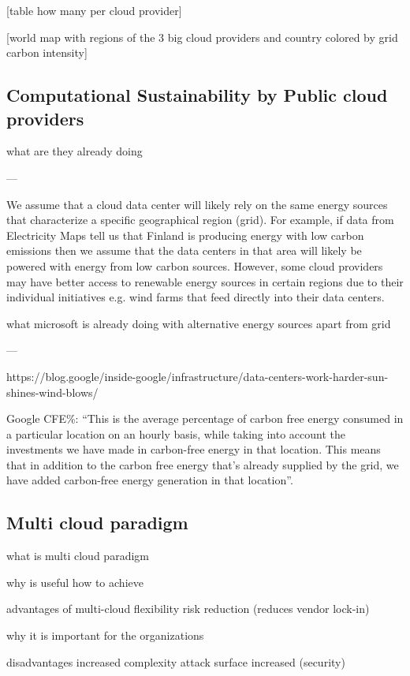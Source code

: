 [table how many per cloud provider]

[world map with regions of the 3 big cloud providers and country colored by grid carbon intensity]

\subsection{Computational Sustainability by Public cloud providers}

what are they already doing

---

We assume that a cloud data center will likely rely on the same energy sources that characterize a specific geographical region (grid).
For example, if data from Electricity Maps tell us that Finland is producing energy with low carbon emissions then we assume that the data centers in that area will likely be powered with energy from low carbon sources.
However, some cloud providers may have better access to renewable energy sources in certain regions due to their individual initiatives e.g. wind farms that feed directly into their data centers.


what microsoft is already doing with alternative energy sources apart from grid


---

https://blog.google/inside-google/infrastructure/data-centers-work-harder-sun-shines-wind-blows/

Google CFE\%: “This is the average percentage of carbon free energy consumed in a particular location on an hourly basis, while taking into account the investments we have made in carbon-free energy in that location. This means that in addition to the carbon free energy that's already supplied by the grid, we have added carbon-free energy generation in that location”.

\subsection{Multi cloud paradigm}

what is multi cloud paradigm

why is useful
how to achieve

advantages of multi-cloud
flexibility
risk reduction (reduces vendor lock-in)

why it is important for the organizations


disadvantages
increased complexity
attack surface increased (security)





